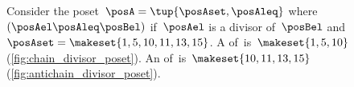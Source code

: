 \vspace{5cm}

\begin{marginfigure}
    \centering
    \caption{}
    \label{fig:chain_divisor_poset}
\end{marginfigure}

\begin{marginfigure}
    \centering
    \caption{}
    \label{fig:antichain_divisor_poset}
\end{marginfigure}

\begin{example}
    Consider the poset~$\posA=\tup{\posAset,\posAleq}$ where~$(\posAel \posAleq \posBel)$ if~$\posAel$ is a divisor of~$\posBel$ and~$\posAset=\makeset{1,5,10,11,13,15}$.
    A  of~\posA is~$\makeset{1,5,10}$ (\cref{fig:chain_divisor_poset}).
    An  of~\posA is~$\makeset{10,11,13,15}$ (\cref{fig:antichain_divisor_poset}).
\end{example}
